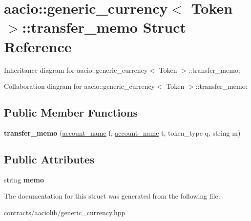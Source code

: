 \hypertarget{structaacio_1_1generic__currency_1_1transfer__memo}{}\section{aacio\+:\+:generic\+\_\+currency$<$ Token $>$\+:\+:transfer\+\_\+memo Struct Reference}
\label{structaacio_1_1generic__currency_1_1transfer__memo}


Inheritance diagram for aacio\+:\+:generic\+\_\+currency$<$ Token $>$\+:\+:transfer\+\_\+memo\+:


Collaboration diagram for aacio\+:\+:generic\+\_\+currency$<$ Token $>$\+:\+:transfer\+\_\+memo\+:
\subsection*{Public Member Functions}
\begin{DoxyCompactItemize}
\item 
\mbox{\label{structaacio_1_1generic__currency_1_1transfer__memo_a3157c8dc75541877bbf1313627dc2bbc}} 
{\bfseries transfer\+\_\+memo} (\mbox{\hyperlink{structaacio_1_1chain_1_1name}{account\+\_\+name}} f, \mbox{\hyperlink{structaacio_1_1chain_1_1name}{account\+\_\+name}} t, token\+\_\+type q, string m)
\end{DoxyCompactItemize}
\subsection*{Public Attributes}
\begin{DoxyCompactItemize}
\item 
\mbox{\label{structaacio_1_1generic__currency_1_1transfer__memo_aa75238df4f9aec6b2eedb6040dd392b1}} 
string {\bfseries memo}
\end{DoxyCompactItemize}


The documentation for this struct was generated from the following file\+:\begin{DoxyCompactItemize}
\item 
contracts/aaciolib/generic\+\_\+currency.\+hpp\end{DoxyCompactItemize}
